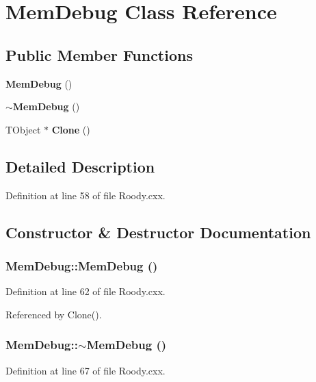 \section{MemDebug Class Reference}
\label{classMemDebug}
\subsection*{Public Member Functions}
\begin{DoxyCompactItemize}
\item 
{\bf MemDebug} ()
\item 
{\bf $\sim$MemDebug} ()
\item 
TObject $\ast$ {\bf Clone} ()
\end{DoxyCompactItemize}


\subsection{Detailed Description}


Definition at line 58 of file Roody.cxx.

\subsection{Constructor \& Destructor Documentation}
\subsubsection[{MemDebug}]{\setlength{\rightskip}{0pt plus 5cm}MemDebug::MemDebug ()\hspace{0.3cm}{\ttfamily  [inline]}}\label{classMemDebug_a3ae05e40241f29fafc75ecb666285cf7}


Definition at line 62 of file Roody.cxx.

Referenced by Clone().
\subsubsection[{$\sim$MemDebug}]{\setlength{\rightskip}{0pt plus 5cm}MemDebug::$\sim$MemDebug ()\hspace{0.3cm}{\ttfamily  [inline]}}\label{classMemDebug_a1d31b9a076202000b27e2b4f7641fef5}


Definition at line 67 of file Roody.cxx.

